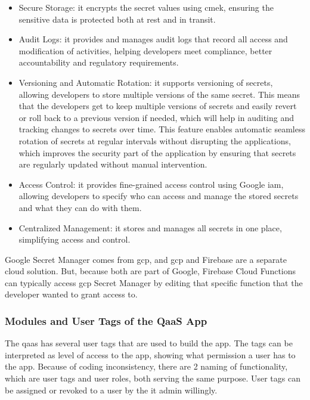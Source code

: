\begin{itemize}
      \item Secure Storage: it encrypts the secret values using \acrshort{cmek}, ensuring the sensitive data is protected
            both at rest and in transit.
      \item Audit Logs: it provides and manages audit logs that record all access and modification of activities, helping
            developers meet compliance, better accountability and regulatory requirements.
      \item Versioning and Automatic Rotation: it supports versioning of secrets, allowing developers to store multiple versions
            of the same secret. This means that the developers get to keep multiple versions of secrets and easily revert or roll
            back to a previous version if needed, which will help in auditing and tracking changes to secrets over time. This feature
            enables automatic seamless rotation of secrets at regular intervals without  disrupting the applications, which improves
            the security part of the application by ensuring that secrets are regularly updated without manual intervention.
      \item Access Control: it provides fine-grained access control using Google \acrshort{iam}, allowing developers to specify
            who can access and manage the stored secrets and what they can do with them.
      \item Centralized Management: it stores and manages all secrets in one place, simplifying access and control.
\end{itemize}

Google Secret Manager comes from \acrshort{gcp}, and \acrshort{gcp} and Firebase are a separate cloud solution. But, because
both are part of Google, Firebase Cloud Functions can typically access \acrshort{gcp} Secret Manager by editing that specific function
that the developer wanted to grant access to.

\subsubsection{Modules and User Tags  of the QaaS App} %

The \acrshort{qaas} has several user tags that are used to build the app. The tags can be interpreted as level of access to the app,
showing what permission a user has to the app. Because of coding inconsistency, there are 2 naming of functionality, which are user
tags and user roles, both serving the same purpose. User tags can be assigned or revoked to a user by the \acrshort{it} admin
willingly.

